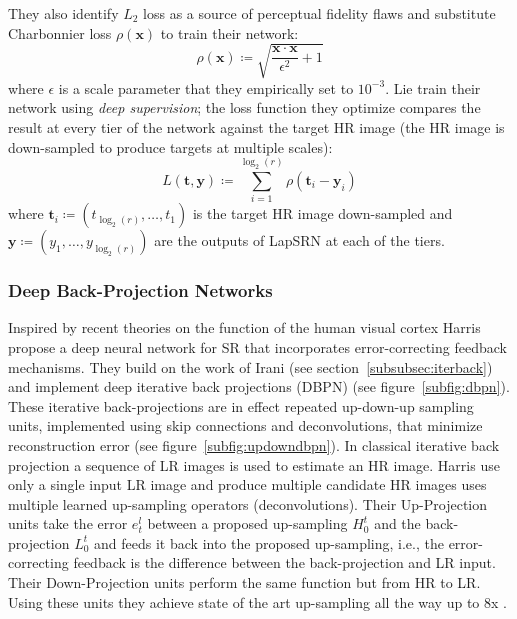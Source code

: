 They also identify \(L_2\) loss as a source of perceptual fidelity flaws and substitute Charbonnier loss \cite{charbonnier1994two} \(\rho(\bm{x})\) to train their network:
\begin{equation}
    \rho(\bm{x}) \coloneqq \sqrt{\frac{\bm{x}\cdot \bm{x}}{\epsilon^2}+ 1}
\end{equation}
where \(\epsilon\) is a scale parameter that they empirically set to \(10^{-3}\). 
%
Lie \etal train their network using \textit{deep supervision}; the loss function they optimize compares the result at every tier of the network against the target HR image (the HR image is down-sampled to produce targets at multiple scales):
\begin{equation}
    L(\bm{t}, \bm{y}) \coloneqq \sum_{i=1}^{\log_2(r)} \rho(\bm{t}_i - \bm{y}_i)
\end{equation}
where \(\bm{t}_i \coloneqq (t_{\log_2{(r)}}, \dots, t_1)\) is the target HR image down-sampled and \(\bm{y} \coloneqq (y_1, \dots, y_{\log_2(r)})\) are the outputs of LapSRN at each of the tiers.
\subsubsection{Deep Back-Projection Networks}\label{subsubsec:dbpn}

Inspired by recent theories on the function of the human visual cortex \cite{kravitz2013ventral} Harris \etal \cite{haris2018deep} propose a deep neural network for SR that incorporates error-correcting feedback mechanisms.
%
They build on the work of Irani \etal (see section~\ref{subsubsec:iterback}) and implement deep iterative back projections (DBPN) (see figure~\ref{subfig:dbpn}).
%
These iterative back-projections are in effect repeated up-down-up sampling units, implemented using skip connections and deconvolutions, that minimize reconstruction error (see figure~\ref{subfig:updowndbpn}).
%
In classical iterative back projection a sequence of LR images is used to estimate an HR image.
%
Harris \etal use only a single input LR image and produce multiple candidate HR images uses multiple learned up-sampling operators (deconvolutions).
%
Their Up-Projection units take the error \(e_t^l\) between a proposed up-sampling \(H_0^t\) and the back-projection \(L_0^t\) and feeds it back into the proposed up-sampling, i.e., the error-correcting feedback is the difference between the back-projection and LR input.
%
Their Down-Projection units perform the same function but from HR to LR.
%
Using these units they achieve state of the art up-sampling all the way up to 8x \cite{timofte2018ntire}.
